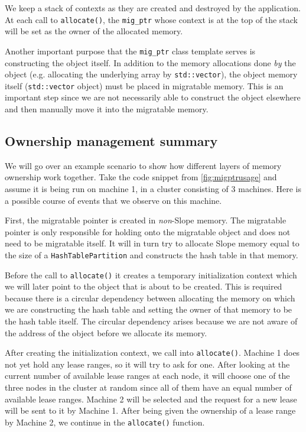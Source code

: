 We keep a stack of contexts as they are created and destroyed by the application.
At each call to \texttt{allocate()}, the \texttt{mig\_ptr} whose context is at
the top of the stack will be set as the owner of the allocated memory.

Another important purpose that the \texttt{mig\_ptr} class template serves is
constructing the object itself. In addition to the memory allocations done
\emph{by} the object (e.g. allocating the underlying array by \texttt{std::vector}),
the object memory itself (\texttt{std::vector} object) must be placed in
migratable memory. This is an important step since we are not necessarily able
to construct the object elsewhere and then manually move it into the migratable
memory.

\subsection{Ownership management summary}
We will go over an example scenario to show how different layers of memory
ownership work together. Take the code snippet from \autoref{fig:migptrusage}
and assume it is being run on machine 1, in a cluster consisting of 3 machines.
Here is a possible course of events that we observe on this machine.

First, the migratable pointer is created in \emph{non}-Slope memory. The
migratable pointer is only responsible for holding onto the migratable object
and does not need to be migratable itself. It will in turn try to allocate
Slope memory equal to the size of a \texttt{HashTablePartition} and constructs the
hash table in that memory.

Before the call to \texttt{allocate()} it creates
a temporary initialization context which we will later point to the object
that is about to be created. This is required because there is a circular
dependency between allocating the memory on which we are constructing the
hash table and setting the owner of that memory to be the hash table itself.
The circular dependency arises because we are not aware of the address of the
object before we allocate its memory.

After creating the initialization context, we call into \texttt{allocate()}.
Machine 1 does not yet hold any lease ranges, so it will try to ask for one.
After looking at the current number of available lease ranges at each node,
it will choose one of the three nodes in the cluster at random since all of them
have an equal number of available lease ranges. Machine 2 will be selected and
the request for a new lease will be sent to it by Machine 1. After being given
the ownership of a lease range by Machine 2, we continue in the
\texttt{allocate()} function.

